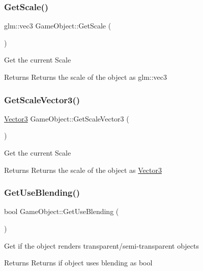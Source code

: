 \subsubsection{\texorpdfstring{GetScale()}{GetScale()}}
{\footnotesize\ttfamily glm\+::vec3 Game\+Object\+::\+Get\+Scale (\begin{DoxyParamCaption}{ }\end{DoxyParamCaption})}

Get the current Scale \begin{DoxyReturn}{Returns}
Returns the scale of the object as glm\+::vec3 
\end{DoxyReturn}
\mbox{\label{class_game_object_a508760ef156d3c6b48dc3ffe97b82ccb}} 
\subsubsection{\texorpdfstring{GetScaleVector3()}{GetScaleVector3()}}
{\footnotesize\ttfamily \mbox{\hyperlink{struct_vector3}{Vector3}} Game\+Object\+::\+Get\+Scale\+Vector3 (\begin{DoxyParamCaption}{ }\end{DoxyParamCaption})}

Get the current Scale \begin{DoxyReturn}{Returns}
Returns the scale of the object as \mbox{\hyperlink{struct_vector3}{Vector3}} 
\end{DoxyReturn}
\mbox{\label{class_game_object_a2397a73d6940e1e4c78bccccc5531788}} 
\subsubsection{\texorpdfstring{GetUseBlending()}{GetUseBlending()}}
{\footnotesize\ttfamily bool Game\+Object\+::\+Get\+Use\+Blending (\begin{DoxyParamCaption}{ }\end{DoxyParamCaption})}

Get if the object renders transparent/semi-\/transparent objects \begin{DoxyReturn}{Returns}
Returns if object uses blending as bool 
\end{DoxyReturn}
\mbox{\label{class_game_object_af6f452c0d3f1d97f5573d6dc1f428424}} 
